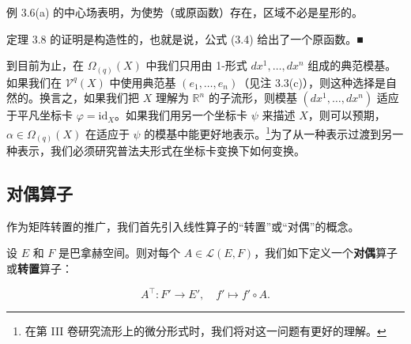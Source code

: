 \begin{remark}

\begin{items}
\item

例 3.6(a) 的中心场表明，为使势（或原函数）存在，区域不必是星形的。

\item

定理 3.8 的证明是构造性的，也就是说，公式 (3.4) 给出了一个原函数。\nobreak\hspace{0.35em}■

\end{items}

到目前为止，在 $ \Omega_{(q)}(X) $ 中我们只用由 1-形式 $ dx^{1},\ldots,dx^{n} $ 组成的典范模基。如果我们在 $ \mathcal{V}^{q}(X) $ 中使用典范基 $ (e_{1},\ldots,e_{n}) $（见注 3.3(c)），则这种选择是自然的。换言之，如果我们把 $ X $ 理解为 $ \mathbb{R}^{n} $ 的子流形，则模基 $ (dx^{1},\ldots,dx^{n}) $ 适应于平凡坐标卡 $ \varphi = \mathrm{id}_{X} $。如果我们用另一个坐标卡 $ \psi $ 来描述 $ X $，则可以预期，$ \alpha \in \Omega_{(q)}(X) $ 在适应于 $ \psi $ 的模基中能更好地表示。\footnote{在第 III 卷研究流形上的微分形式时，我们将对这一问题有更好的理解。}为了从一种表示过渡到另一种表示，我们必须研究普法夫形式在坐标卡变换下如何变换。

\end{remark}

\subsection*{对偶算子}

作为矩阵转置的推广，我们首先引入线性算子的“转置”或“对偶”的概念。

设 $ E $ 和 $ F $ 是巴拿赫空间。则对每个 $ A \in \mathcal{L}(E,F) $，我们如下定义一个\textbf{对偶}算子或\textbf{转置}算子：

\[
A^{\top} : F' \to E' , \quad f' \mapsto f' \circ A .
\]

